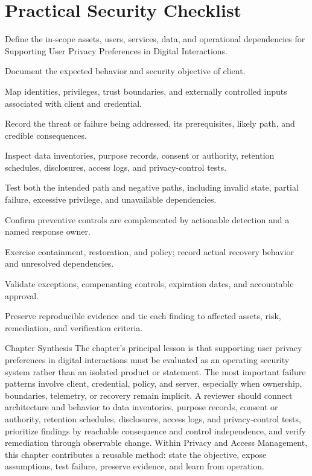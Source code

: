 \documentclass[11pt,letterpaper]{article}
\begin{document}
\section*{Practical Security Checklist}
\begin{CornellChecklist}
\item Define the in-scope assets, users, services, data, and operational dependencies for Supporting User Privacy Preferences in Digital Interactions.
\item Document the expected behavior and security objective of client.
\item Map identities, privileges, trust boundaries, and externally controlled inputs associated with client and credential.
\item Record the threat or failure being addressed, its prerequisites, likely path, and credible consequences.
\item Inspect data inventories, purpose records, consent or authority, retention schedules, disclosures, access logs, and privacy-control tests.
\item Test both the intended path and negative paths, including invalid state, partial failure, excessive privilege, and unavailable dependencies.
\item Confirm preventive controls are complemented by actionable detection and a named response owner.
\item Exercise containment, restoration, and policy; record actual recovery behavior and unresolved dependencies.
\item Validate exceptions, compensating controls, expiration dates, and accountable approval.
\item Preserve reproducible evidence and tie each finding to affected assets, risk, remediation, and verification criteria.
\end{CornellChecklist}
\begin{CornellSummaryBox}{Chapter Synthesis}
The chapter's principal lesson is that supporting user privacy preferences in digital interactions must be evaluated as an operating security system rather than an isolated product or statement. The most important failure patterns involve client, credential, policy, and server, especially when ownership, boundaries, telemetry, or recovery remain implicit. A reviewer should connect architecture and behavior to data inventories, purpose records, consent or authority, retention schedules, disclosures, access logs, and privacy-control tests, prioritize findings by reachable consequence and control independence, and verify remediation through observable change. Within Privacy and Access Management, this chapter contributes a reusable method: state the objective, expose assumptions, test failure, preserve evidence, and learn from operation.
\end{CornellSummaryBox}
\end{document}
